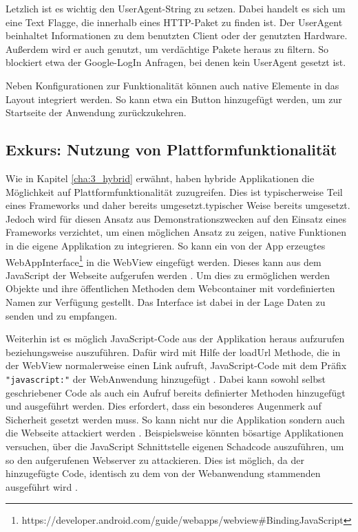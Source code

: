 Letzlich ist es wichtig den UserAgent-String zu setzen. Dabei handelt es sich um eine Text Flagge, die innerhalb eines HTTP-Paket zu finden ist. Der UserAgent beinhaltet Informationen zu dem benutzten Client oder der genutzten Hardware. Außerdem wird er auch genutzt, um verdächtige Pakete heraus zu filtern\cite{UserAgentString}. So blockiert etwa der Google-LogIn Anfragen, bei denen kein UserAgent gesetzt ist.

Neben Konfigurationen zur Funktionalität können auch native Elemente in das Layout integriert werden. So kann etwa ein Button hinzugefügt werden, um zur Startseite der Anwendung zurückzukehren.

\subsection{Exkurs: Nutzung von Plattformfunktionalität}
Wie in Kapitel \ref{cha:3_hybrid} erwähnt, haben hybride Applikationen die Möglichkeit auf Plattformfunktionalität zuzugreifen. 
Dies ist typischerweise Teil eines Frameworks und daher bereits umgesetzt.typischer Weise bereits umgesetzt. 
Jedoch wird für diesen Ansatz aus Demonstrationszwecken auf den Einsatz eines Frameworks verzichtet, um einen möglichen Ansatz zu zeigen, native Funktionen in die eigene Applikation zu integrieren. So kann ein von der App erzeugtes WebAppInterface\footnote{https://developer.android.com/guide/webapps/webview\#BindingJavaScript} in die WebView eingefügt werden. Dieses kann aus dem JavaScript der Webseite aufgerufen werden \cite{webview_javascript_security}. Um dies zu ermöglichen werden Objekte und ihre öffentlichen Methoden dem Webcontainer mit vordefinierten Namen zur Verfügung gestellt. Das Interface ist dabei in der Lage Daten zu senden und zu empfangen.

Weiterhin ist es möglich JavaScript-Code aus der Applikation heraus aufzurufen beziehungsweise auszuführen. Dafür wird mit Hilfe der loadUrl Methode, die in der WebView normalerweise einen Link aufruft, JavaScript-Code mit dem Präfix \verb|"javascript:"| der WebAnwendung hinzugefügt \cite{webview_javascript_security}.
Dabei kann sowohl selbst geschriebener Code als auch ein Aufruf bereits definierter Methoden hinzugefügt und ausgeführt werden.
Dies erfordert, dass ein besonderes Augenmerk auf Sicherheit gesetzt werden muss. So kann nicht nur die Applikation sondern auch die Webseite attackiert werden \cite{webview_javascript_security}. 
Beispielsweise könnten bösartige Applikationen versuchen, über die JavaScript Schnittstelle eigenen Schadcode auszuführen, um so den aufgerufenen Webserver zu attackieren. Dies ist möglich, da der hinzugefügte Code, identisch zu dem von der Webanwendung stammenden ausgeführt wird \cite{webview_javascript_security}.

